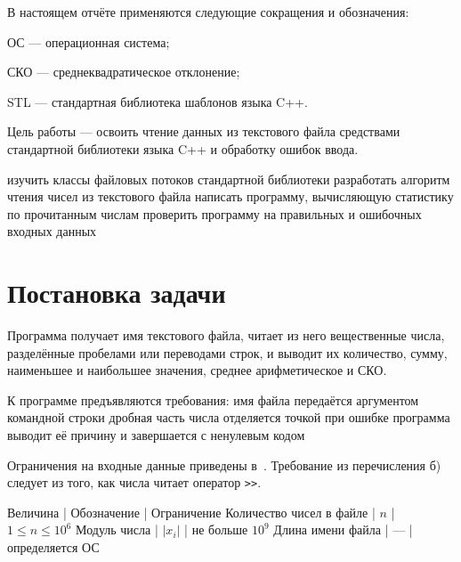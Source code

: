 \documentclass[a4paper,14pt]{extarticle}
\begin{document}
\maketitle
\suaitoc


В настоящем отчёте применяются следующие сокращения и обозначения:

ОС — операционная система;

СКО — среднеквадратическое отклонение;

STL — стандартная библиотека шаблонов языка C++.

\suaiintro

Цель работы — освоить чтение данных из текстового файла средствами
стандартной библиотеки языка C++ и обработку ошибок ввода.

\suaitasks
изучить классы файловых потоков стандартной библиотеки
разработать алгоритм чтения чисел из текстового файла
написать программу, вычисляющую статистику по прочитанным числам
проверить программу на правильных и ошибочных входных данных

\section{Постановка задачи}

Программа получает имя текстового файла, читает из него вещественные
числа, разделённые пробелами или переводами строк, и выводит их
количество, сумму, наименьшее и наибольшее значения, среднее
арифметическое и СКО.

К программе предъявляются требования:
\suaienum
имя файла передаётся аргументом командной строки
дробная часть числа отделяется точкой
при ошибке программа выводит её причину и завершается с ненулевым кодом

Ограничения на входные данные приведены в~. Требование
из перечисления б) следует из того, как числа читает оператор
\texttt{>>}.

Величина                 | Обозначение | Ограничение
Количество чисел в файле | $n$         | $1 \le n \le 10^{6}$
Модуль числа             | $|x_i|$     | не больше $10^{9}$
Длина имени файла        | —           | определяется ОС
\end{document}
